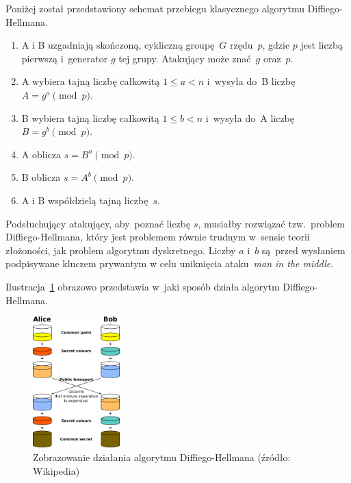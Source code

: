 \documentclass[thesis]{subfiles}
\begin{document}
Poniżej został przedstawiony schemat przebiegu klasycznego algorytmu Diffiego-Hellmana.

\begin{enumerate}
\item A i B uzgadniają skończoną, cykliczną groupę~$G$ rzędu~$p$, gdzie $p$ jest liczbą pierwszą i~generator $g$ tej grupy. Atakujący może znać~$g$ oraz~$p$.
\item A wybiera tajną liczbę całkowitą $1 \leq a < n$ i~wysyła do~B liczbę $A=g^a \pmod{p}$.
\item B wybiera tajną liczbę całkowitą $1 \leq b < n$ i~wysyła do~A liczbę $B=g^b \pmod{p}$.
\item A oblicza $s=B^a \pmod{p}$.
\item B oblicza $s=A^b \pmod{p}$.
\item A i B współdzielą tajną liczbę~$s$.
\end{enumerate}

Podsłuchujący atakujący, aby~poznać liczbę $s$, musiałby rozwiązać tzw.~problem Diffiego-Hellmana, który jest problemem równie trudnym w~sensie teorii złożoności, jak problem algorytmu dyskretnego. Liczby $a$ i~$b$ są~przed wysłaniem podpisywane kluczem prywantym w celu uniknięcia ataku~\emph{man in the middle}.

Ilustracja~\ref{fig:dh} obrazowo przedstawia w~jaki sposób działa algorytm Diffiego-Hellmana.

\begin{figure}[hb]
	\centering
	\includegraphics[width=0.3\textwidth]{img/Diffie-Hellman_Key_Exchange.pdf}
	\caption{Zobrazowanie działania algorytmu Diffiego-Hellmana (źródło: Wikipedia)}
	\label{fig:dh}
\end{figure}
\end{document}

